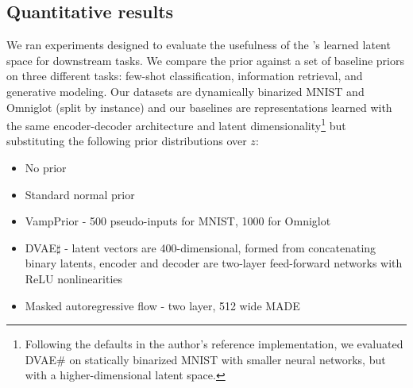\subsection{Quantitative results}

We ran experiments designed to
evaluate the usefulness of the \acronym's
learned latent space for downstream tasks. We 
compare the \acronym\;prior
against a set of baseline priors
on three different tasks:
few-shot classification,
information retrieval,
and generative modeling.
Our datasets are
dynamically binarized MNIST and Omniglot 
(split by instance) and
our baselines are representations
learned with the same encoder-decoder
architecture and latent dimensionality\footnote{Following the defaults
in the author's reference implementation, we evaluated
DVAE\# on statically binarized MNIST with smaller neural networks, but
with a higher-dimensional latent space.} but substituting
the following prior distributions over $z$:
\begin{itemize}
    \setlength\itemsep{0.2em}
    \item No prior
    \item Standard normal prior
    \item VampPrior \citep{Tomczak2017} - 500 pseudo-inputs for MNIST, 1000 for Omniglot
    \item DVAE$\sharp$ \citep{Vahdat2018dvaesharp} - latent vectors are 400-dimensional, formed from concatenating binary latents, encoder and decoder are two-layer feed-forward networks with ReLU nonlinearities
    \item Masked autoregressive flow \citep[MAF; ][]{Papamakarios2017} - two layer, 512 wide MADE
\end{itemize}
